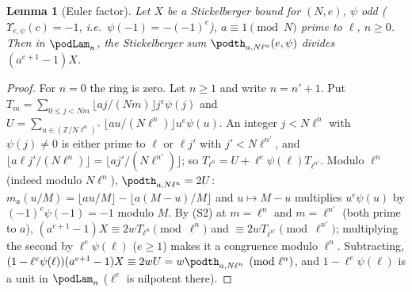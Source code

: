 \documentclass[10pt]{amsart}
\newtheorem{lemma}[theorem]{Lemma}
\theoremstyle{definition}
\theoremstyle{remark}
\newcommand{\Z}{\mathbb Z}
\begin{document}
\begin{lemma}[Euler factor]\label{pod:thetadiv}
Let $X$ be a Stickelberger bound for $(N,e)$, $\psi$ odd \textup($\Upsilon_{e,\psi}(c)=-1$, i.e.\
$\psi(-1)=-(-1)^e$\textup), $a\equiv1\pmod N$ prime to $\ell$, $n\ge0$. Then in $\podLam_n$, the
Stickelberger sum $\podth_{a,N\ell^n}(e,\psi)$ divides $(a^{e+1}-1)X$.
\end{lemma}
\begin{proof}
For $n=0$ the ring is zero. Let $n\ge1$ and write $n=n'+1$. Put $T_m=\sum_{0\le j<Nm}\lfloor aj/(Nm)
\rfloor j^e\psi(j)$ and $U=\sum_{u\in(\Z/N\ell^n)^\times}\lfloor au/(N\ell^n)\rfloor u^e\psi(u)$. An
integer $j<N\ell^n$ with $\psi(j)\ne0$ is either prime to $\ell$ or $\ell j'$ with $j'<N\ell^{n'}$, and
$\lfloor a\ell j'/(N\ell^n)\rfloor=\lfloor aj'/(N\ell^{n'})\rfloor$; so $T_{\ell^n}=U+\ell^e\psi(\ell)
T_{\ell^{n'}}$. Modulo $\ell^n$ (indeed modulo $N\ell^n$), $\podth_{a,N\ell^n}=2U$: $m_a(u/M)=
\lfloor au/M\rfloor-\lfloor a(M-u)/M\rfloor$ and $u\mapsto M-u$ multiplies $u^e\psi(u)$ by
$(-1)^e\psi(-1)=-1$ modulo $M$. By (S2) at $m=\ell^n$ and $m=\ell^{n'}$ (both prime to $a$),
$(a^{e+1}-1)X\equiv2wT_{\ell^n}\pmod{\ell^n}$ and $\equiv2wT_{\ell^{n'}}\pmod{\ell^{n'}}$; multiplying
the second by $\ell^e\psi(\ell)$ ($e\ge1$) makes it a congruence modulo $\ell^n$. Subtracting,
$(1-\ell^e\psi(\ell))(a^{e+1}-1)X\equiv2wU=w\podth_{a,N\ell^n}\pmod{\ell^n}$, and $1-\ell^e\psi(\ell)$
is a unit in $\podLam_n$ ($\ell^e$ is nilpotent there).
\end{proof}
\end{document}
